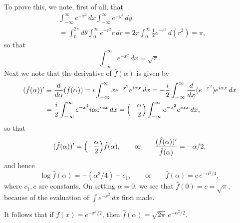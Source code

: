 To prove this, we note, first of all, that
\begin{equation*}
\begin{aligned}
&\int_{-\infty}^{\infty}e^{-x^2}\,dx  \int_{-\infty}^{\infty}e^{-y^2}\,dy\\
&= \int_0^{2\pi}d\theta  \int_0^\infty e^{-r^2}r\,dr = 2\pi  \int_0^\infty\tfrac12 e^{-r^2}\,d(r^2) = \pi,
\end{aligned}
\end{equation*}
so that
\begin{equation*}
\int_{-\infty}^{\infty}e^{-x^2}\,dx=\sqrt\pi.
\end{equation*}
Next we note that the derivative of $\hat f(\alpha)$ is given by
\begin{align*}
(\hat f(\alpha))'&\equiv\frac{d}{d\alpha}(\hat f(\alpha))
=i\int_{-\infty}^{\infty}x e^{-x^2}e^{i\alpha x}\,dx
=-\frac{i}{2}\int_{-\infty}^{\infty}\frac{d}{dx}(e^{-x^2})e^{i\alpha x}\,dx\\
&=\frac{i}{2}\int_{-\infty}^{\infty}e^{-x^2}i\alpha e^{i\alpha x}\,dx
=\Bigl(-\frac{\alpha}{2}\Bigr)\int_{-\infty}^{\infty}e^{-x^2}e^{i\alpha x}\,dx,
\end{align*}
so that
\begin{equation*}
(\hat f(\alpha))'=\Bigl(-\frac{\alpha}{2}\Bigr)\hat f(\alpha),
\qquad\text{or}\qquad
\frac{(\hat f(\alpha))'}{\hat f(\alpha)}=-\alpha/2,
\end{equation*}
and hence
\begin{equation*}
\log\hat f(\alpha)=-(\alpha^2/4)+c_1,
\qquad\text{or}\qquad
\hat f(\alpha)=c\,e^{-\alpha^2/4},
\end{equation*}
where $c_1,c$ are constants. On setting $\alpha=0$, we see that $\hat f(0)=c=\sqrt\pi$, because of the evaluation of $\int e^{-x^2}\,dx$ first made.

It follows that if $f(x)=e^{-x^2/2}$, then $\hat f(\alpha)=\sqrt{2\pi}\,e^{-\alpha^2/2}$.

